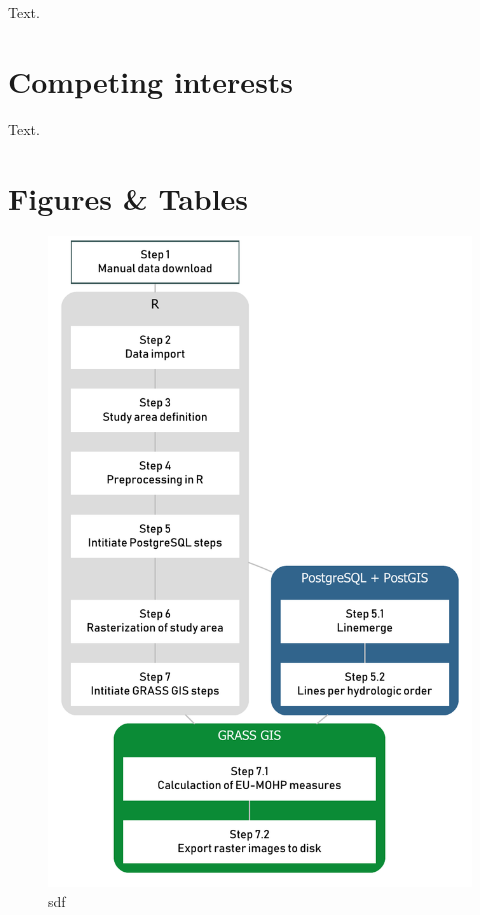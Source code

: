 \documentclass[fleqn,10pt]{wlscirep}
\begin{document}
Text.

\hypertarget{competing-interests}{%
\section*{Competing interests}\label{competing-interests}}

Text.

\hypertarget{figures-tables}{%
\section*{Figures \& Tables}\label{figures-tables}}

\begin{figure}[H]

{\centering \includegraphics[width=0.7\linewidth]{diagramms/flowchart} 

}

\caption{sdf}\label{fig:flowchart}
\end{figure}

\nocite{*}

\end{document}
